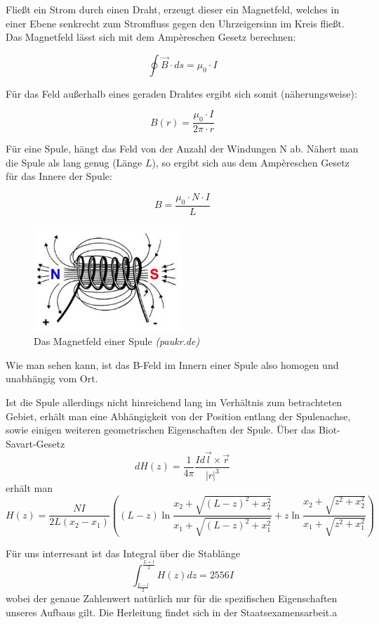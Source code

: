Fließt ein Strom durch einen Draht, erzeugt dieser ein Magnetfeld, welches in einer Ebene senkrecht zum Stromfluss gegen den Uhrzeigersinn im Kreis fließt. Das Magnetfeld lässt sich mit dem Ampèreschen Gesetz berechnen:

\begin{equation} \oint \vec B \cdot ds = \mu_0\cdot I \end{equation}

Für das Feld außerhalb eines geraden Drahtes ergibt sich somit (näherungsweise):

$$B(r) = \frac{\mu_0\cdot I}{2\pi\cdot r} $$

Für eine Spule, hängt das Feld von der Anzahl der Windungen N ab. Nähert man die Spule als lang genug (Länge $L$), so ergibt sich aus dem Ampèreschen Gesetz für das Innere der Spule:

\begin{equation} B = \frac{\mu_0\cdot N\cdot I}{L} \end{equation}


\begin{figure}[H]
	\centering \includegraphics[width = 0.5\textwidth]{Bilder/Spule.jpg}
	\caption{Das Magnetfeld einer Spule \emph{(paukr.de)}}
\end{figure}

Wie man sehen kann, ist das B-Feld im Innern einer Spule also homogen und unabhängig vom Ort.

Ist die Spule allerdings nicht hinreichend lang im Verhältnis zum betrachteten Gebiet, erhält man eine Abhängigkeit von der Position entlang der Spulenachse, sowie einigen weiteren geometrischen Eigenschaften der Spule. Über das Biot-Savart-Gesetz
$$  dH\left( z \right) = \frac{1}{4 \pi} \frac{I d\vec{l} \times \vec{r}}{\left|r\right|^3} $$
erhält man
$$ H \left( z \right) = \frac{N I}{2 L \left( x_2 - x_1 \right)} \left( \left( L - z \right) \ln \frac{x_2 + \sqrt{\left( L-z \right)^2 + x_2^2}}{x_1 + \sqrt{\left( L - z \right)^2 + x_1^2}} + z \ln \frac{x_2 + \sqrt{z^2 + x_2^2}}{x_1 + \sqrt{z^2 + x_1^2}}  \right) $$

Für uns interresant ist das Integral über die Stablänge
$$ \int_{\frac{L-l}{2}}^{\frac{L+l}{2}} H\left( z \right) dz = 2556 I $$
wobei der genaue Zahlenwert natürlich nur für die spezifischen Eigenschaften unseres Aufbaus gilt. Die Herleitung findet sich in der Staatsexamensarbeit.a


\clearpage
